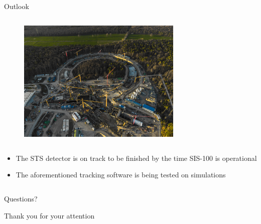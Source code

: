 \begin{columnframe}{Outlook}
    \begin{column}{0.5\textwidth}
        \begin{figure}
            \centering
            \includegraphics[width=0.7\textwidth, frame]{images/sis100_construction_site.jpg}
        \end{figure}
    \end{column}
    \begin{column}{0.5\textwidth}
        \begin{itemize}
            \item The STS detector is on track to be finished by the time SIS-100 is operational
            \item The aforementioned tracking software is being tested on simulations
        \end{itemize}
    \end{column}
\end{columnframe}

\begin{frame}
    \centering
    \Large{Questions?}
\end{frame}

\begin{frame}{}
    \centering
    \Large{Thank you for your attention}
\end{frame}

